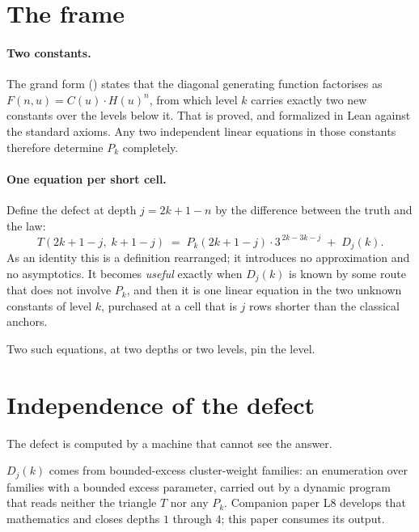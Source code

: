 \documentclass[11pt]{article}
\newcommand{\Dj}{D_j}
\begin{document}
\section{The frame}
\label{sec:frame}

\paragraph{Two constants.} The grand form
() states that the diagonal generating function
factorises as $F(n,u) = C(u)\cdot H(u)^n$, from which level $k$ carries exactly
two new constants over the levels below it. That is proved, and formalized in
Lean against the standard axioms. Any two independent linear equations in those
constants therefore determine $P_k$ completely.

\paragraph{One equation per short cell.} Define the defect at depth
$j = 2k+1-n$ by the difference between the truth and the law:
\begin{equation}\label{eq:pin}
  T(2k+1-j,\; k+1-j) \;=\; P_k(2k+1-j)\cdot 3^{\,2k-3k-j} \;+\; \Dj(k).
\end{equation}
As an identity this is a definition rearranged; it introduces no approximation
and no asymptotics. It becomes \emph{useful} exactly when $\Dj(k)$ is known by
some route that does not involve $P_k$, and then it is one linear equation in
the two unknown constants of level $k$, purchased at a cell that is $j$ rows
shorter than the classical anchors.

Two such equations, at two depths or two levels, pin the level.

\section{Independence of the defect}\label{sec:circular}

The defect is computed by a machine that cannot see the answer.

$\Dj(k)$ comes from bounded-excess cluster-weight families: an enumeration over
families with a bounded excess parameter, carried out by a dynamic program that
reads neither the triangle $T$ nor any $P_k$. Companion paper L8 develops
that mathematics and closes depths $1$ through $4$; this paper consumes its
output.
\end{document}
